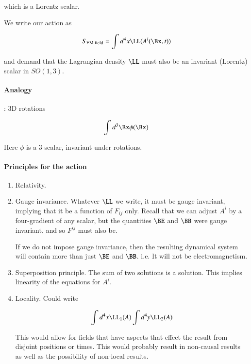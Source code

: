 which is a Lorentz scalar.

We write our action as

\begin{equation}\label{eqn:relativisticElectrodynamicsL12b:170}
S_{\text{EM field}} = \int d^4 x \LL(A^i(\Bx, t))
\end{equation}

and demand that the Lagrangian density \(\LL\) must also be an invariant (Lorentz) scalar in \(SO(1,3)\).

\paragraph{Analogy}: 3D rotations

\begin{equation}\label{eqn:relativisticElectrodynamicsL12b:190}
\int d^3 \Bx \phi(\Bx)
\end{equation}

Here \(\phi\) is a 3-scalar, invariant under rotations.

\paragraph{Principles for the action}

\begin{enumerate}
\item Relativity.
\item Gauge invariance.  Whatever \(\LL\) we write, it must be gauge invariant, implying that it be a function of \(F_{ij}\) only.  Recall that we can adjust \(A^i\) by a four-gradient of any scalar, but the quantities \(\BE\) and \(\BB\) were gauge invariant, and so \(F^{ij}\) must also be.

If we do not impose gauge invariance, then the resulting dynamical system will contain more than just \(\BE\) and \(\BB\).  i.e. It will not be electromagnetism.

\item Superposition principle.  The sum of two solutions is a solution.  This implies linearity of the equations for \(A^i\).

\item Locality.  Could write

\begin{equation}\label{eqn:relativisticElectrodynamicsL12b:210}
\int d^4 x \LL_1(A) \int d^4 y \LL_2(A)
\end{equation}

This would allow for fields that have aspects that effect the result from disjoint positions or times.  This would probably result in non-causal results as well as the possibility of non-local results.
\end{enumerate}

